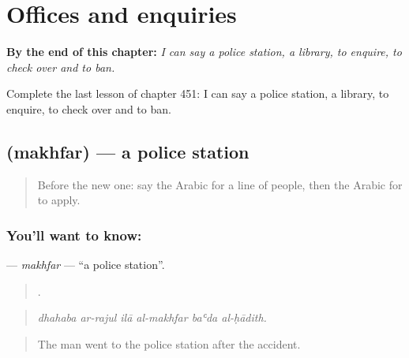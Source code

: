 
\chapter{Offices and enquiries}
\label{ch:ar-offices-and-enquiries}

\begin{chapteropening}
\textbf{By the end of this chapter:} \emph{I can say a police station, a library, to enquire, to check over and to ban.}

Complete the last lesson of chapter 451: I can say a police station, a library, to enquire, to check over and to ban.
\end{chapteropening}

\section[\texorpdfstring{\ar{مخفر} (makhfar)}{مخفر (makhfar)}]{ (makhfar) — a police station}

\label{lesson:AR-C451-makhfar}



\begin{quote}
Before the new one: say the Arabic for a line of people, then the Arabic for to apply.
\end{quote}

\subsection*{You'll want to know: }
\textbf{} — \emph{makhfar} — \textquotedblleft{}a police station\textquotedblright{}.

\begin{quote}
     .
\end{quote}

\begin{quote}
\emph{dhahaba ar-rajul ilā al-makhfar baʿda al-ḥādith.}
\end{quote}

\begin{quote}
The man went to the police station after the accident.
\end{quote}

